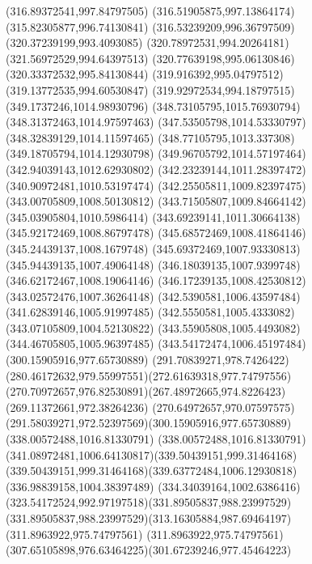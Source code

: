 {    \lineto(316.89372541,997.84797505)
    \lineto(316.51905875,997.13864174)
    \lineto(315.82305877,996.74130841)
    \lineto(316.53239209,996.36797509)
    \closepath
    \moveto(320.37239199,993.4093085)
    \lineto(320.78972531,994.20264181)
    \lineto(321.56972529,994.64397513)
    \lineto(320.77639198,995.06130846)
    \lineto(320.33372532,995.84130844)
    \lineto(319.916392,995.04797512)
    \lineto(319.13772535,994.60530847)
    \lineto(319.92972534,994.18797515)
    \closepath
    \moveto(349.1737246,1014.98930796)
    \lineto(348.73105795,1015.76930794)
    \lineto(348.31372463,1014.97597463)
    \lineto(347.53505798,1014.53330797)
    \lineto(348.32839129,1014.11597465)
    \lineto(348.77105795,1013.337308)
    \lineto(349.18705794,1014.12930798)
    \lineto(349.96705792,1014.57197464)
    \closepath
    \moveto(342.94039143,1012.62930802)
    \lineto(342.23239144,1011.28397472)
    \lineto(340.90972481,1010.53197474)
    \lineto(342.25505811,1009.82397475)
    \lineto(343.00705809,1008.50130812)
    \lineto(343.71505807,1009.84664142)
    \lineto(345.03905804,1010.5986414)
    \lineto(343.69239141,1011.30664138)
    \closepath
    \moveto(345.92172469,1008.86797478)
    \lineto(345.68572469,1008.41864146)
    \lineto(345.24439137,1008.1679748)
    \lineto(345.69372469,1007.93330813)
    \lineto(345.94439135,1007.49064148)
    \lineto(346.18039135,1007.9399748)
    \lineto(346.62172467,1008.19064146)
    \lineto(346.17239135,1008.42530812)
    \closepath
    \moveto(343.02572476,1007.36264148)
    \lineto(342.5390581,1006.43597484)
    \lineto(341.62839146,1005.91997485)
    \lineto(342.5550581,1005.4333082)
    \lineto(343.07105809,1004.52130822)
    \lineto(343.55905808,1005.4493082)
    \lineto(344.46705805,1005.96397485)
    \lineto(343.54172474,1006.45197484)
    \closepath
    \moveto(300.15905916,977.65730889)
    \curveto(291.70839271,978.7426422)(280.46172632,979.55997551)(272.61639318,977.74797556)
    \curveto(270.70972657,976.82530891)(267.48972665,974.8226423)(269.11372661,972.38264236)
    \curveto(270.64972657,970.07597575)(291.58039271,972.52397569)(300.15905916,977.65730889)
    \moveto(338.00572488,1016.81330791)
    \curveto(338.00572488,1016.81330791)(341.08972481,1006.64130817)(339.50439151,999.31464168)
    \curveto(339.50439151,999.31464168)(339.63772484,1006.12930818)(336.98839158,1004.38397489)
    \curveto(334.34039164,1002.6386416)(323.54172524,992.97197518)(331.89505837,988.23997529)
    \curveto(331.89505837,988.23997529)(313.16305884,987.69464197)(311.8963922,975.74797561)
    \curveto(311.8963922,975.74797561)(307.65105898,976.63464225)(301.67239246,977.45464223)
}
